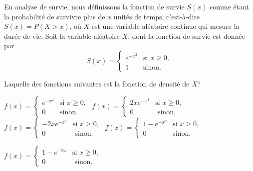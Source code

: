 \begin{questions}
\begin{solution}
\end{solution}
\question[3] En analyse de survie, nous définissons la fonction de survie $S(x)$ comme étant la probabilité de survivre plus de $x$ unités de temps, c'est-à-dire $S(x)=P(X>x)$, où $X$ est une variable aléatoire continue qui mesure la durée de vie.  Soit la variable aléatoire $X$, dont la fonction de survie est donnée par 
\[ S(x) =
\begin{cases}
   \displaystyle e^{-x^2}& \text{si } x \ge 0, \\
    1 & \text{sinon}.
\end{cases}
\]

Laquelle des fonctions suivantes est la fonction de densité de $X$?

\begin{checkboxes}
\choice $f(x)=\left\{
			\begin{array}{ll}
   \displaystyle e^{-x^2}& \text{si } x \ge 0, \\
			0 & \mbox{sinon.}
			\end{array}
			\right. $
		\vspace{0.3cm}
\correctchoice $ f(x) = \left\{
			\begin{array}{ll}
   \displaystyle 2xe^{-x^2}& \text{si } x \ge 0, \\
			0 & \mbox{ sinon.}
			\end{array}
			\right. $
   		\vspace{0.3cm}
\choice $ f(x) = \left\{
			\begin{array}{ll}
   \displaystyle -2xe^{-x^2}& \text{si } x \ge 0, \\
			0 & \mbox{ sinon.}
			\end{array}
			\right. $
   		\vspace{0.3cm}
\choice $ f(x) = \left\{
			\begin{array}{ll}
   \displaystyle 1-e^{-x^2}& \text{si } x \ge 0, \\
			0 & \mbox{sinon.}
			\end{array}
			\right. $
   		\vspace{0.3cm}

\choice $ f(x) = \left\{
			\begin{array}{ll}
   \displaystyle 1-e^{-2x}& \text{si } x \ge 0
   , \\

			0 &  \mbox{ sinon. }
			\end{array}
			\right. $

      		\vspace{0.3cm}


\end{checkboxes}
\end{questions}
